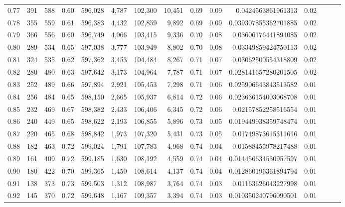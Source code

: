 \begin{tabular}{rrrrrrrrrrrrrrr}
0.77 &     391 &    588 &  0.60 &  596,028 &    4,787 &  102,300 &   10,451 &  0.69 &  0.09 &     0.0424563861961313 &      0.02 \\
0.78 &     355 &    559 &  0.61 &  596,383 &    4,432 &  102,859 &    9,892 &  0.69 &  0.09 &   0.039307855362701885 &      0.02 \\
0.79 &     366 &    556 &  0.60 &  596,749 &    4,066 &  103,415 &    9,336 &  0.70 &  0.08 &    0.03606176441894085 &      0.02 \\
0.80 &     289 &    534 &  0.65 &  597,038 &    3,777 &  103,949 &    8,802 &  0.70 &  0.08 &    0.03349859424750113 &      0.02 \\
0.81 &     324 &    535 &  0.62 &  597,362 &    3,453 &  104,484 &    8,267 &  0.71 &  0.07 &    0.03062500554318809 &      0.02 \\
0.82 &     280 &    480 &  0.63 &  597,642 &    3,173 &  104,964 &    7,787 &  0.71 &  0.07 &   0.028141657280201505 &      0.02 \\
0.83 &     252 &    489 &  0.66 &  597,894 &    2,921 &  105,453 &    7,298 &  0.71 &  0.06 &   0.025906643843513582 &      0.01 \\
0.84 &     256 &    484 &  0.65 &  598,150 &    2,665 &  105,937 &    6,814 &  0.72 &  0.06 &   0.023636154003068708 &      0.01 \\
0.85 &     232 &    469 &  0.67 &  598,382 &    2,433 &  106,406 &    6,345 &  0.72 &  0.06 &    0.02157852258516554 &      0.01 \\
0.86 &     240 &    449 &  0.65 &  598,622 &    2,193 &  106,855 &    5,896 &  0.73 &  0.05 &   0.019449938359748474 &      0.01 \\
0.87 &     220 &    465 &  0.68 &  598,842 &    1,973 &  107,320 &    5,431 &  0.73 &  0.05 &    0.01749873615311616 &      0.01 \\
0.88 &     182 &    463 &  0.72 &  599,024 &    1,791 &  107,783 &    4,968 &  0.74 &  0.04 &    0.01588455978217488 &      0.01 \\
0.89 &     161 &    409 &  0.72 &  599,185 &    1,630 &  108,192 &    4,559 &  0.74 &  0.04 &   0.014456634530957597 &      0.01 \\
0.90 &     180 &    422 &  0.70 &  599,365 &    1,450 &  108,614 &    4,137 &  0.74 &  0.04 &   0.012860196361894794 &      0.01 \\
0.91 &     138 &    373 &  0.73 &  599,503 &    1,312 &  108,987 &    3,764 &  0.74 &  0.03 &    0.01163626043227998 &      0.01 \\
0.92 &     145 &    370 &  0.72 &  599,648 &    1,167 &  109,357 &    3,394 &  0.74 &  0.03 &   0.010350240796090501 &      0.01 \\

\end{tabular}
